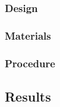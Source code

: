 \documentclass[a4paper,man,natbib,noextraspace]{apa6}
\begin{document}
\subsubsection{Design}

\subsubsection{Materials}

\subsubsection{Procedure}

\subsection{Results}


\end{document}
